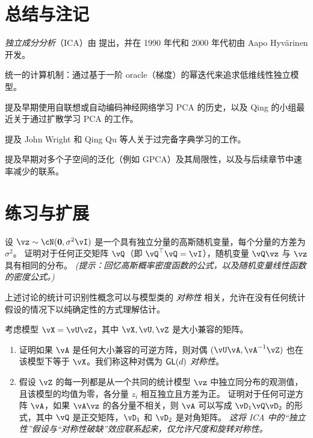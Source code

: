 \documentclass[../../book-main.tex]{subfiles}
\begin{document}
\section{总结与注记}


\textit{独立成分分析}（ICA）由 \cite{Ans-1985} 提出，并在 1990 年代和 2000 年代初由 Aapo Hyv\"{a}rinen 开发。

统一的计算机制：通过基于一阶 oracle（梯度）的幂迭代来追求低维线性独立模型。

提及早期使用自联想或自动编码神经网络学习 PCA 的历史，以及 Qing 的小组最近关于通过扩散学习 PCA 的工作。

提及 John Wright 和 Qing Qu 等人关于过完备字典学习的工作。

提及早期对多个子空间的泛化（例如 GPCA）及其局限性，以及与后续章节中速率减少的联系。

\section{练习与扩展}

\begin{exercise}\label{exercise:gaussian-rot-invar}
    设 $\vz \sim \cN(\Zero, \sigma^2 \vI)$ 是一个具有独立分量的高斯随机变量，每个分量的方差为 $\sigma^2$。
    证明对于任何正交矩阵 $\vQ$（即 $\vQ^\top \vQ = \vI$），随机变量 $\vQ \vz$ 与 $\vz$ 具有相同的分布。
    \textit{(提示：回忆高斯概率密度函数的公式，以及随机变量线性函数的密度公式。)}
\end{exercise}

\begin{exercise}\label{exercise:symmetry-identifiability}
    上述讨论的统计可识别性概念可以与模型类的 \textit{对称性} 相关，允许在没有任何统计假设的情况下以纯确定性的方式理解估计。


考虑模型 $\vX = \vU \vZ$，其中 $\vX, \vU, \vZ$ 是大小兼容的矩阵。
    \begin{enumerate}
        \item 证明如果 $\vA$ 是任何大小兼容的可逆方阵，则对偶 $(\vU \vA, \vA^{-1} \vZ)$ 也在该模型下等于 $\vX$。我们称这种对偶为 \textit{$\mathsf{GL}(d)$ 对称性}。
        \item 假设 $\vZ$ 的每一列都是从一个共同的统计模型 $\vz$ 中独立同分布的观测值，且该模型的均值为零，各分量 $z_i$ 相互独立且方差为正。
        证明对于任何可逆方阵 $\vA$，如果 $\vA \vz$ 的各分量不相关，则 $\vA$ 可以写成 $\vD_1 \vQ \vD_2$ 的形式，其中 $\vQ$ 是正交矩阵，$\vD_1$ 和 $\vD_2$ 是对角矩阵。
        \textit{这将 ICA 中的“独立性”假设与“对称性破缺”效应联系起来，仅允许尺度和旋转对称性。}
    \end{enumerate}

\end{exercise}
\end{document}
